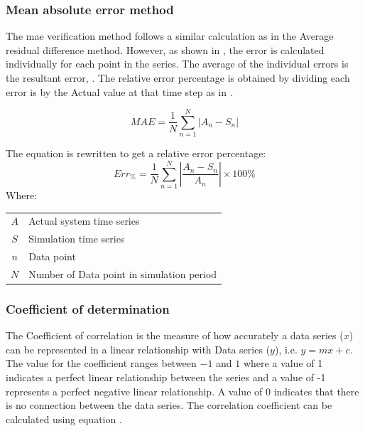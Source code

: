  		\subsubsection{Mean absolute error method}
 		The \gls{mae} verification method follows a similar calculation as in the Average residual difference method. However, as shown in , the error is calculated individually for each point in the series. The average of the individual errors is the resultant error, . The relative error percentage is obtained by dividing each error is by the Actual value at that time step as in .
 		\par
 		\begin{equation}
 		\label{eq: Relative error 2}
 		MAE = \dfrac{1}{N}\sum_{n=1}^{N}{\left|A_{n} - S_{n}\right| }
 		\end{equation}
 		
 			The equation is rewritten to get a relative error percentage:	
 			\begin{equation}
 			\label{eq: Relative error}
 			Err_{\%} = \dfrac{1}{N}\sum_{n=1}^{N}{\left|\dfrac{A_{n} - S_{n}}{A_{n}}\right| }\times 100 \%
 			\end{equation}
 			Where: \par
 			\begin{table}[h!]
 				\centering
 				\begin{tabular}{cl}
 					$A$ & Actual system time series \\
 					$S$ & Simulation time series \\
 					$n$ & Data point \\
 					$N$ & Number of Data point in simulation period \\
 				\end{tabular} 
 			\end{table} 
 		\subsubsection{Coefficient of determination}
 		The Coefficient of correlation is the measure of how accurately a data series ($ x $) can be represented in a linear relationship with Data series ($ y $), i.e. $ y = mx+c$. The value for the coefficient ranges between $ -1 $ and $ 1 $ where a value of 1 indicates a perfect linear relationship between the series and a value of -1 represents a perfect negative linear relationship. A value of 0 indicates that there is no connection between the data series. The correlation coefficient can be calculated using equation .\cite{sarin2010comparing}
 		

